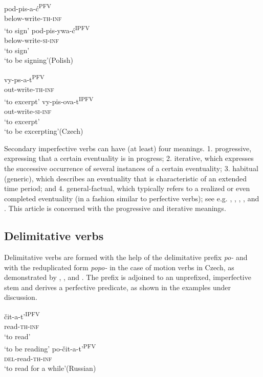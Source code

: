 \documentclass[output=paper,colorlinks,citecolor=brown]{langscibook}
\begin{document}
\ea\label{biskup:ex:second-pol}\ea\gll pod-pis-a-ć\textsuperscript{PFV}\\
below-write-\textsc{th-inf}\\
\glt ‘to sign’\label{biskup:ex:second-pol.a}
\ex\gll pod-pis-ywa-ć\textsuperscript{IPFV}\\
below-write-\textsc{si-inf}\\
\glt ‘to sign’\\‘to be signing’\hfill(Polish)\label{biskup:ex:second-pol.b}
\z\z

\ea\label{biskup:ex:second-cz}\ea\gll vy-ps-a-t\textsuperscript{PFV}\\
out-write-\textsc{th-inf}\\
\glt ‘to excerpt’\label{biskup:ex:second-cz.a}
\ex\gll vy-pis-ova-t\textsuperscript{IPFV}\\
out-write-\textsc{si-inf}\\
\glt ‘to excerpt’\\`to be excerpting’\hfill(Czech)\label{biskup:ex:second-cz.b}
\z\z

\noindent Secondary imperfective verbs can have (at least) four meanings. 1. progressive, expressing that a certain eventuality is in progress; 2. iterative, which expresses the successive occurrence of several instances of a certain eventuality; 3. habitual (generic), which describes an eventuality that is characteristic of an extended time period; and 4. general-factual, which typically refers to a realized or even completed eventuality (in a fashion similar to perfective verbs); see e.g. \citet[24--40]{bis:Comrie1976}, \citet[75--102]{Dahl1985}, \citet[49--125]{bis:Dickey2000}, \citet[22--30]{Groenn2004}, \citet[417--424]{Timberlake2004} and \citet[64--76]{Petruchina2011}. This article is concerned with the progressive and iterative meanings.

\subsection{Delimitative verbs}\label{biskup:sec:delim}

Delimitative verbs are formed with the help of the delimitative prefix \textit{po-} and with the reduplicated form \textit{popo-} in the case of motion verbs in Czech, as demonstrated by , , and . The prefix is adjoined to an unprefixed, imperfective stem and derives a perfective predicate, as shown in the examples under discussion. 

\ea\label{biskup:ex:del-rus}\ea\gll čit-a-t'\textsuperscript{IPFV}\\
read-\textsc{th-inf}\\
\glt ‘to read’\\‘to be reading’\label{biskup:ex:del-rus.a}
\ex\gll po-čit-a-t'\textsuperscript{PFV}\\
\textsc{del}-read-\textsc{th-inf}\\
\glt ‘to read for a while’\hfill(Russian)\label{biskup:ex:del-rus.b}
\z\z
\end{document}
